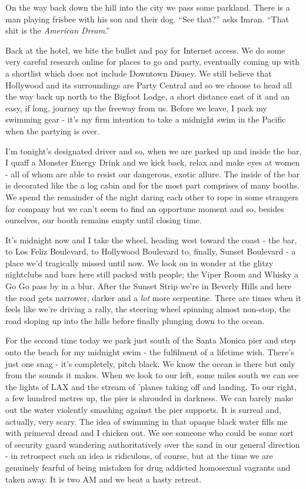 \documentclass[a5paper,titlepage,11pt]{book}
\begin{document}
On the way back down the hill into the city we pass some parkland.  There is a man playing frisbee with his son and their dog. ``See that?'' asks Imran.  ``That shit is the \emph{American Dream}.''

Back at the hotel, we bite the bullet and pay for Internet access.  We do some very careful research online for places to go and party, eventually coming up with a shortlist which does not include Downtown Disney.  We still believe that Hollywood and its surroundings are Party Central and so we choose to head all the way back up north to the Bigfoot Lodge, a short distance east of it and an easy, if long, journey up the freeway from us.  Before we leave, I pack my swimming gear - it's my firm intention to take a midnight swim in the Pacific when the partying is over.

I'm tonight's designated driver and so, when we are parked up and inside the bar, I quaff a Monster Energy Drink and we kick back, relax and make eyes at women - all of whom are able to resist our dangerous, exotic allure.  The inside of the bar is decorated like the a log cabin and for the most part comprises of many booths.  We spend the remainder of the night daring each other to rope in some strangers for company but we can't seem to find an opportune moment and so, besides ourselves, our booth remains empty until closing time.

It's midnight now and I take the wheel, heading west toward the coast - the bar, to Los Feliz Boulevard, to Hollywood Boulevard to, finally, Sunset Boulevard - a place we'd tragically missed until now.  We look on in wonder at the glitzy nightclubs and bars here still packed with people; the Viper Room and Whisky a Go Go pass by in a blur.  After the Sunset Strip we're in Beverly Hills and here the road gets narrower, darker and a \emph{lot} more serpentine.  There are times when it feels like we're driving a rally, the steering wheel spinning almost non-stop, the road sloping up into the hills before finally plunging down to the ocean.

For the second time today we park just south of the Santa Monica pier and step onto the beach for my midnight swim - the fulfilment of a lifetime wish.  There's just one snag - it's completely, pitch black.  We know the ocean is there but only from the sounds it makes.  When we look to our left, some miles south we can see the lights of LAX and the stream of 'planes taking off and landing.  To our right, a few hundred metres up, the pier is shrouded in darkness.  We can barely make out the water violently smashing against the pier supports.  It is surreal and, actually, very scary.  The idea of swimming in that opaque black water fills me with primeval dread and I chicken out.  We see someone who could be some sort of security guard wandering authoritatively over the sand in our general direction - in retrospect such an idea is ridiculous, of course, but at the time we are genuinely fearful of being mistaken for drug addicted homosexual vagrants and taken away.  It is two AM and we beat a hasty retreat.
\end{document}
